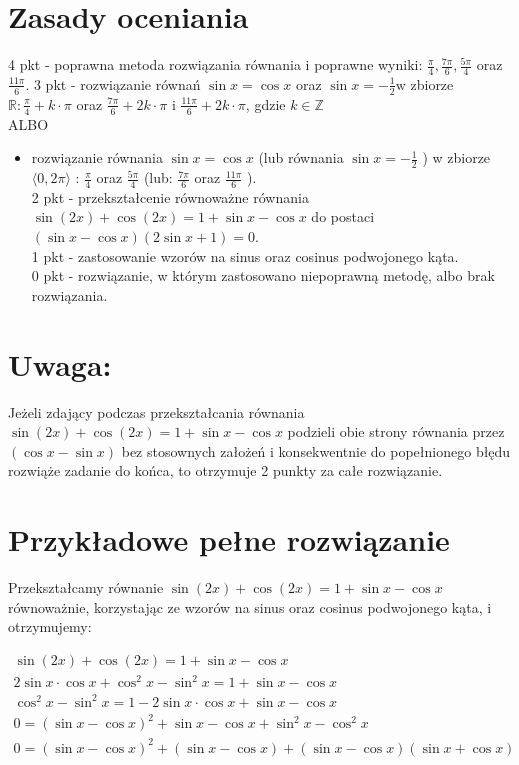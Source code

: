 \documentclass[10pt]{article}
\begin{document}
\section*{Zasady oceniania}
4 pkt - poprawna metoda rozwiązania równania i poprawne wyniki: $\frac{\pi}{4}, \frac{7 \pi}{6}, \frac{5 \pi}{4}$ oraz $\frac{11 \pi}{6}$. 3 pkt - rozwiązanie równań $\sin x=\cos x$ oraz $\sin x=-\frac{1}{2} \mathrm{w}$ zbiorze $\mathbb{R}: \frac{\pi}{4}+k \cdot \pi$ oraz $\frac{7 \pi}{6}+2 k \cdot \pi$ i $\frac{11 \pi}{6}+2 k \cdot \pi$, gdzie $k \in \mathbb{Z}$\\
ALBO

\begin{itemize}
  \item rozwiązanie równania $\sin x=\cos x$ (lub równania $\sin x=-\frac{1}{2}$ ) w zbiorze $\langle 0,2 \pi\rangle$ : $\frac{\pi}{4}$ oraz $\frac{5 \pi}{4}$ (lub: $\frac{7 \pi}{6}$ oraz $\frac{11 \pi}{6}$ ).\\
2 pkt - przekształcenie równoważne równania $\sin (2 x)+\cos (2 x)=1+\sin x-\cos x$ do postaci $(\sin x-\cos x)(2 \sin x+1)=0$.\\
1 pkt - zastosowanie wzorów na sinus oraz cosinus podwojonego kąta.\\
0 pkt - rozwiązanie, w którym zastosowano niepoprawną metodę, albo brak rozwiązania.
\end{itemize}

\section*{Uwaga:}
Jeżeli zdający podczas przekształcania równania $\sin (2 x)+\cos (2 x)=1+\sin x-\cos x$ podzieli obie strony równania przez $(\cos x-\sin x)$ bez stosownych założeń i konsekwentnie do popełnionego błędu rozwiąże zadanie do końca, to otrzymuje 2 punkty za całe rozwiązanie.

\section*{Przykładowe pełne rozwiązanie}
Przekształcamy równanie $\sin (2 x)+\cos (2 x)=1+\sin x-\cos x$ równoważnie, korzystając ze wzorów na sinus oraz cosinus podwojonego kąta, i otrzymujemy:

$$
\begin{gathered}
\sin (2 x)+\cos (2 x)=1+\sin x-\cos x \\
2 \sin x \cdot \cos x+\cos ^{2} x-\sin ^{2} x=1+\sin x-\cos x \\
\cos ^{2} x-\sin ^{2} x=1-2 \sin x \cdot \cos x+\sin x-\cos x \\
0=(\sin x-\cos x)^{2}+\sin x-\cos x+\sin ^{2} x-\cos ^{2} x \\
0=(\sin x-\cos x)^{2}+(\sin x-\cos x)+(\sin x-\cos x)(\sin x+\cos x)
\end{gathered}
$$
\end{document}
